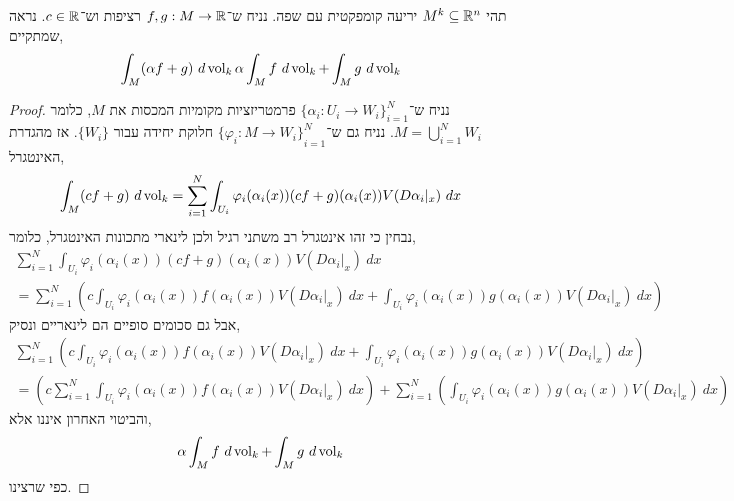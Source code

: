 \question{}
\subquestion{}
תהי $M^k \subseteq \mathbb{R}^n$ יריעה קומפקטית עם שפה.
נניח ש־$f, g : M \to \mathbb{R}$ רציפות וש־$c \in \mathbb{R}$.
נראה שמתקיים,
\[
	\int_M (\alpha f + g)\ d\operatorname{vol}_k
	\alpha \int_M f\ d\operatorname{vol}_k + \int_M g\ d\operatorname{vol}_k
\]
\begin{proof}
	נניח ש־${\{ \alpha_i : U_i \to W_i \}}_{i = 1}^N$ פרמטריזציות מקומיות המכסות את $M$, כלומר $M = \bigcup_{i = 1}^N W_i$.
	נניח גם ש־${\{ \varphi_i : M \to W_i \}}_{i = 1}^N$ חלוקת יחידה עבור $\{ W_i \}$.
	אז מהגדרת האינטגרל,
	\[
		\int_M (c f + g)\ d\vol_k
		= \sum_{i = 1}^N \int_{U_i} \varphi_i(\alpha_i(x)) (c f + g)(\alpha_i(x)) V(D \alpha_i |_x)\ dx
	\]
	נבחין כי זהו אינטגרל רב משתני רגיל ולכן לינארי מתכונות האינטגרל, כלומר,
	\begin{multline*}
		\sum_{i = 1}^N \int_{U_i} \varphi_i(\alpha_i(x)) (c f + g)(\alpha_i(x)) V(D \alpha_i |_x)\ dx \\
		= \sum_{i = 1}^N \left( c \int_{U_i} \varphi_i(\alpha_i(x)) f(\alpha_i(x)) V(D \alpha_i |_x)\ dx + \int_{U_i} \varphi_i(\alpha_i(x)) g(\alpha_i(x)) V(D \alpha_i |_x)\ dx \right)
	\end{multline*}
	אבל גם סכומים סופיים הם לינאריים ונסיק,
	\begin{multline*}
		\sum_{i = 1}^N \left( c \int_{U_i} \varphi_i(\alpha_i(x)) f(\alpha_i(x)) V(D \alpha_i |_x)\ dx + \int_{U_i} \varphi_i(\alpha_i(x)) g(\alpha_i(x)) V(D \alpha_i |_x)\ dx \right) \\
		= \left( c \sum_{i = 1}^N \int_{U_i} \varphi_i(\alpha_i(x)) f(\alpha_i(x)) V(D \alpha_i |_x)\ dx \right) + \sum_{i = 1}^N \left( \int_{U_i} \varphi_i(\alpha_i(x)) g(\alpha_i(x)) V(D \alpha_i |_x)\ dx \right)
	\end{multline*}
	והביטוי האחרון איננו אלא,
	\[
		\alpha \int_M f\ d\vol_k + \int_M g\ d\vol_k
	\]
	כפי שרצינו.
\end{proof}

